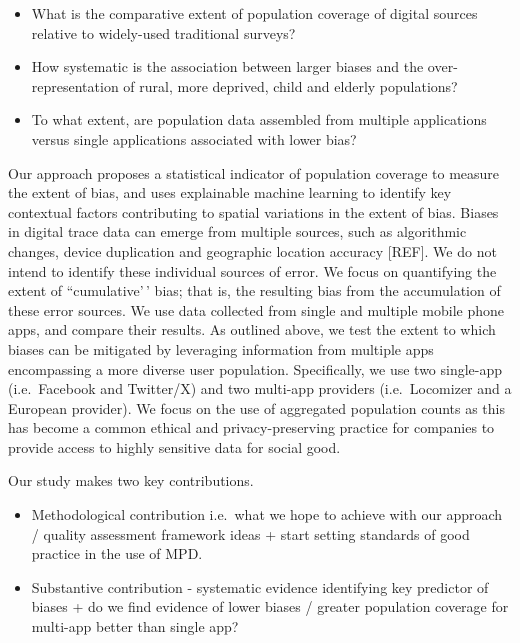 \documentclass[]{rsos}%
\providecommand{\tightlist}{%
  \setlength{\itemsep}{0pt}\setlength{\parskip}{0pt}}
\begin{document}
\begin{itemize}
\tightlist
\item
  What is the comparative extent of population coverage of digital
  sources relative to widely-used traditional surveys?
\item
  How systematic is the association between larger biases and the
  over-representation of rural, more deprived, child and elderly
  populations?
\item
  To what extent, are population data assembled from multiple
  applications versus single applications associated with lower bias?
\end{itemize}

Our approach proposes a statistical indicator of population coverage to
measure the extent of bias, and uses explainable machine learning to
identify key contextual factors contributing to spatial variations in
the extent of bias. Biases in digital trace data can emerge from
multiple sources, such as algorithmic changes, device duplication and
geographic location accuracy {[}REF{]}. We do not intend to identify these
individual sources of error. We focus on quantifying the extent of
``cumulative'\,' bias; that is, the resulting bias from the accumulation
of these error sources. We use data collected from single and multiple
mobile phone apps, and compare their results. As outlined above, we test
the extent to which biases can be mitigated by leveraging information
from multiple apps encompassing a more diverse user population.
Specifically, we use two single-app (i.e.~Facebook and Twitter/X) and
two multi-app providers (i.e.~Locomizer and a European provider). We
focus on the use of aggregated population counts as this has become a
common ethical and privacy-preserving practice for companies to provide
access to highly sensitive data for social good.

Our study makes two key contributions.

\begin{itemize}
\item
  Methodological contribution i.e.~what we hope to achieve with our
  approach / quality assessment framework ideas + start setting
  standards of good practice in the use of MPD.
\item
  Substantive contribution - systematic evidence identifying key
  predictor of biases + do we find evidence of lower biases / greater
  population coverage for multi-app better than single app?
\end{itemize}
\end{document}
